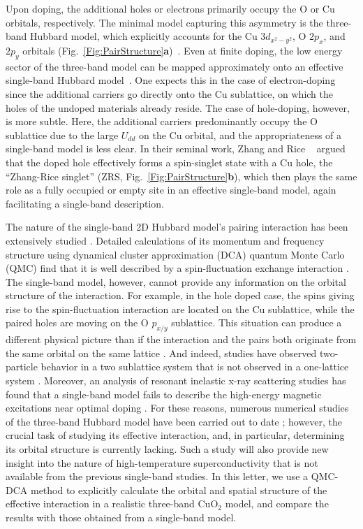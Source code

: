 \documentclass[fleqn,twocolumn,11pt]{wlscirep}
\begin{document}
Upon doping, the additional holes or electrons primarily occupy the O or Cu orbitals, respectively. The minimal model capturing this asymmetry is the three-band Hubbard model, which explicitly accounts for the Cu $3d_{x^2-y^2}$, O $2p_{x}$, and $2p_y$ orbitals (Fig.~\ref{Fig:PairStructure}{\bf  a})~\cite{EmeryPRL1987}. Even at finite doping, the low energy sector of the three-band model can be mapped approximately onto an effective single-band Hubbard model~\cite{ZhangRice}. One expects this in the case of electron-doping since the additional carriers go directly onto the Cu sublattice, on which the holes of the undoped materials already reside. The case of hole-doping, however, is more subtle. Here, the additional carriers predominantly occupy the O sublattice due to the large $U_{dd}$ on the Cu orbital, and the appropriateness of a single-band model is less clear. In their seminal work, Zhang and Rice ~\cite{ZhangRice} argued that the doped hole effectively forms a spin-singlet state with a Cu hole, the ``Zhang-Rice singlet'' (ZRS, Fig.~\ref{Fig:PairStructure}{\bf b}), which then plays the same role as a fully occupied or empty site in an effective single-band model, again facilitating a single-band description.

The nature of the single-band 2D Hubbard model's pairing interaction has been extensively studied \cite{Maier4PRL, Maier07, Maier08, Kyung09, Gull14, Maier16}. Detailed calculations of its momentum and frequency structure using dynamical cluster approximation (DCA) quantum Monte Carlo (QMC) \cite{Maier4PRL} find that it is well described by a spin-fluctuation exchange interaction \cite{Maier07}. The single-band model, however, cannot provide any information on the orbital structure of the interaction. For example, in the hole doped case, the spins giving rise to the spin-fluctuation interaction are located on the Cu sublattice, while the paired holes are moving on the O $p_{x/y}$ sublattice. This situation can produce a different physical picture than if the interaction and the pairs both originate from the same orbital on the same lattice \cite{Lau11,Ebra14,Ebra16,Adolphs16,Jiang20}. And indeed, studies have observed two-particle behavior in a two sublattice system that is not observed in a one-lattice system \cite{Moeller12}. Moreover, an analysis of resonant inelastic x-ray scattering studies has found that a single-band model fails to describe the high-energy magnetic excitations near optimal doping \cite{Chen13}. For these reasons, numerous numerical studies of the three-band Hubbard model have been carried out to date \cite{Dopf, Arrigoni, Kung, Thomale, Weber1, Weber2, Weber3, Weber4, Acharya, Huang, Cui,Biborski,Zegrodnik}; however, the crucial task of studying its effective interaction, and, in particular, determining its orbital structure is currently lacking. Such a study will also provide new insight into the nature of high-temperature superconductivity that is not available from the previous single-band studies. In this letter, we use a QMC-DCA method to explicitly calculate the orbital and spatial structure of the effective interaction in a realistic three-band CuO$_2$ model, and compare the results with those obtained from a single-band model.
\end{document}
